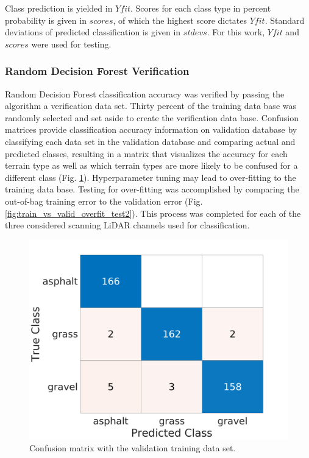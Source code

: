 \documentclass[numbered,pdftex]{ohio-etd}
\begin{document}
{{{{				
				
				{Class prediction is yielded in $Yfit$. Scores for each class type in percent probability is given in $scores$, of which the highest score dictates $Yfit$. Standard deviations of predicted classification is given in $stdevs$. For this work, $Yfit$  and $scores$ were used for testing.}

				
			} %

	
			\subsubsection{Random Decision Forest Verification}\label{sec:random-decision-forest-verification}{
			
				{Random Decision Forest classification accuracy was verified by passing the algorithm a verification data set. Thirty percent of the training data base was randomly selected and set aside to create the verification data base. Confusion matrices provide classification accuracy information on validation database by classifying each data set in the validation database and comparing actual and predicted classes, resulting in a matrix that visualizes the accuracy for each terrain type as well as which terrain types are more likely to be confused for a different class (Fig. \ref{fig:vali_err_conf_mat_range}). Hyperparameter tuning may lead to over-fitting to the training data base. Testing for over-fitting was accomplished by comparing the out-of-bag training error to the validation error (Fig. \ref{fig:train_vs_valid_overfit_test2}). This process was completed for each of the three considered scanning LiDAR channels used for classification. }
								
				\begin{figure}[H]
					\centering
					\includegraphics[width=0.65\linewidth]{Defense_Images/chan_2c_conf_VALIDATION_mat222}
					\caption[Validation Error]{Confusion matrix with the validation training data set.}
					\label{fig:vali_err_conf_mat_range}
				\end{figure}
			
}}}}
\end{document}
